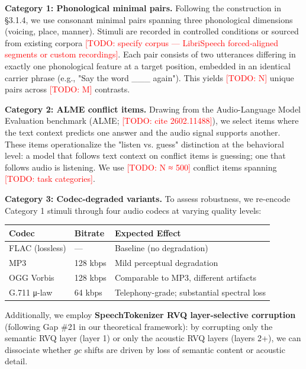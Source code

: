\documentclass[a4paper]{article}
\begin{document}
\textbf{Category 1: Phonological minimal pairs.} Following the construction in §3.1.4, we use consonant minimal pairs spanning three phonological dimensions (voicing, place, manner). Stimuli are recorded in controlled conditions or sourced from existing corpora \textcolor{red}{[TODO: specify corpus — LibriSpeech forced-aligned segments or custom recordings]}. Each pair consists of two utterances differing in exactly one phonological feature at a target position, embedded in an identical carrier phrase (e.g., "Say the word \_\_\_ again"). This yields \textcolor{red}{[TODO: N]} unique pairs across \textcolor{red}{[TODO: M]} contrasts.

\textbf{Category 2: ALME conflict items.} Drawing from the Audio-Language Model Evaluation benchmark (ALME; \textcolor{red}{[TODO: cite 2602.11488]}), we select items where the text context predicts one answer and the audio signal supports another. These items operationalize the "listen vs. guess" distinction at the behavioral level: a model that follows text context on conflict items is guessing; one that follows audio is listening. We use \textcolor{red}{[TODO: N ≈ 500]} conflict items spanning \textcolor{red}{[TODO: task categories]}.

\textbf{Category 3: Codec-degraded variants.} To assess robustness, we re-encode Category 1 stimuli through four audio codecs at varying quality levels:

\begin{table}[htbp]
\centering
\begin{tabular}{lll}
\toprule
Codec & Bitrate & Expected Effect \\
\midrule
FLAC (lossless) & — & Baseline (no degradation) \\
MP3 & 128 kbps & Mild perceptual degradation \\
OGG Vorbis & 128 kbps & Comparable to MP3, different artifacts \\
G.711 μ-law & 64 kbps & Telephony-grade; substantial spectral loss \\
\bottomrule
\end{tabular}
\end{table}

Additionally, we employ \textbf{SpeechTokenizer RVQ layer-selective corruption} (following Gap \#21 in our theoretical framework): by corrupting only the semantic RVQ layer (layer 1) or only the acoustic RVQ layers (layers 2+), we can dissociate whether $gc$ shifts are driven by loss of semantic content or acoustic detail.
\end{document}

